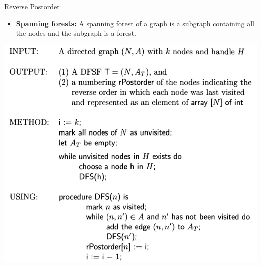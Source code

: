 \documentclass[aspectratio=1610, 13pt]{beamer}
\begin{document}
\begin{frame}{Reverse Postorder}
\begin{itemize}
\item \textbf{Spanning forests:} A spanning forest of a graph is a subgraph containing all the nodes and the subgraph is a forest.
\end{itemize}
\begin{center}
\includegraphics[scale=0.37]{dfsf.png}
\end{center}
\end{frame}
\end{document}
